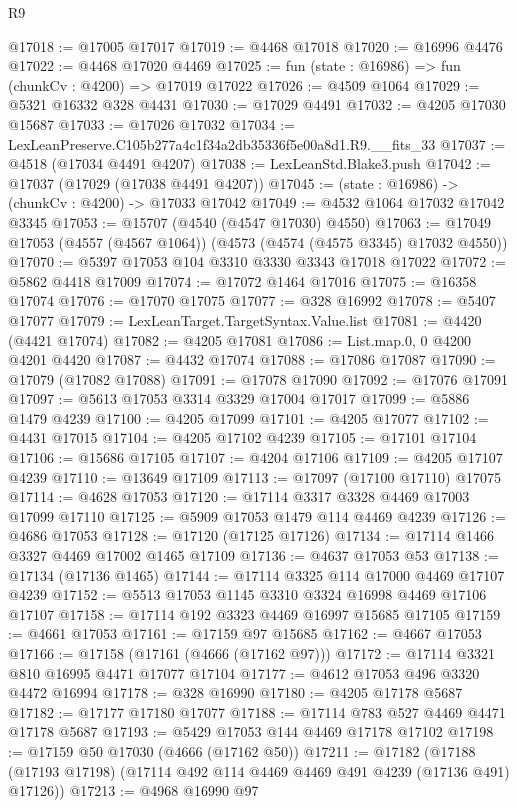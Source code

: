 \begin{lexlean}{R9}
\begin{coremodule}
@17018 := @17005 @17017
@17019 := @4468 @17018
@17020 := @16996 @4476
@17022 := @4468 @17020 @4469
@17025 := fun (state : @16986) => fun (chunkCv : @4200) => @17019 @17022
@17026 := @4509 @1064
@17029 := @5321 @16332 @328 @4431
@17030 := @17029 @4491
@17032 := @4205 @17030 @15687
@17033 := @17026 @17032
@17034 := LexLeanPreserve.C105b277a4c1f34a2db35336f5e00a8d1.R9.__fits_33
@17037 := @4518 (@17034 @4491 @4207)
@17038 := LexLeanStd.Blake3.push
@17042 := @17037 (@17029 (@17038 @4491 @4207))
@17045 := (state : @16986) -> (chunkCv : @4200) -> @17033 @17042
@17049 := @4532 @1064 @17032 @17042 @3345
@17053 := @15707 (@4540 (@4547 @17030) @4550)
@17063 := @17049 @17053 (@4557 (@4567 @1064)) (@4573 (@4574 (@4575 @3345) @17032 @4550))
@17070 := @5397 @17053 @104 @3310 @3330 @3343 @17018 @17022
@17072 := @5862 @4418 @17009
@17074 := @17072 @1464 @17016
@17075 := @16358 @17074
@17076 := @17070 @17075
@17077 := @328 @16992
@17078 := @5407 @17077
@17079 := LexLeanTarget.TargetSyntax.Value.list
@17081 := @4420 (@4421 @17074)
@17082 := @4205 @17081
@17086 := List.map.{0, 0} @4200 @4201 @4420
@17087 := @4432 @17074
@17088 := @17086 @17087
@17090 := @17079 (@17082 @17088)
@17091 := @17078 @17090
@17092 := @17076 @17091
@17097 := @5613 @17053 @3314 @3329 @17004 @17017
@17099 := @5886 @1479 @4239
@17100 := @4205 @17099
@17101 := @4205 @17077
@17102 := @4431 @17015
@17104 := @4205 @17102 @4239
@17105 := @17101 @17104
@17106 := @15686 @17105
@17107 := @4204 @17106
@17109 := @4205 @17107 @4239
@17110 := @13649 @17109
@17113 := @17097 (@17100 @17110) @17075
@17114 := @4628 @17053
@17120 := @17114 @3317 @3328 @4469 @17003 @17099 @17110
@17125 := @5909 @17053 @1479 @114 @4469 @4239
@17126 := @4686 @17053
@17128 := @17120 (@17125 @17126)
@17134 := @17114 @1466 @3327 @4469 @17002 @1465 @17109
@17136 := @4637 @17053 @53
@17138 := @17134 (@17136 @1465)
@17144 := @17114 @3325 @114 @17000 @4469 @17107 @4239
@17152 := @5513 @17053 @1145 @3310 @3324 @16998 @4469 @17106 @17107
@17158 := @17114 @192 @3323 @4469 @16997 @15685 @17105
@17159 := @4661 @17053
@17161 := @17159 @97 @15685
@17162 := @4667 @17053
@17166 := @17158 (@17161 (@4666 (@17162 @97)))
@17172 := @17114 @3321 @810 @16995 @4471 @17077 @17104
@17177 := @4612 @17053 @496 @3320 @4472 @16994
@17178 := @328 @16990
@17180 := @4205 @17178 @5687
@17182 := @17177 @17180 @17077
@17188 := @17114 @783 @527 @4469 @4471 @17178 @5687
@17193 := @5429 @17053 @144 @4469 @17178 @17102
@17198 := @17159 @50 @17030 (@4666 (@17162 @50))
@17211 := @17182
    (@17188 (@17193 @17198) (@17114 @492 @114 @4469 @4469 @491 @4239 (@17136 @491) @17126))
@17213 := @4968 @16990 @97

\end{coremodule}
\end{lexlean}
